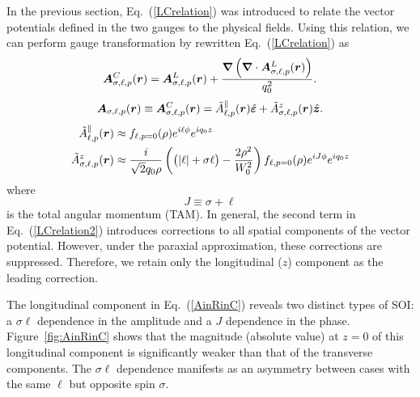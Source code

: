 In the previous section, Eq.~(\ref{LCrelation}) was introduced to relate the vector potentials defined in the two gauges to the physical fields. Using this relation, we can perform gauge transformation by rewritten Eq.~(\ref{LCrelation}) as
\begin{equation}
\color{G}
\boldsymbol{A}^{C}_{\sigma, \ell, p}(\boldsymbol{r})
=
\boldsymbol{A}^{L}_{\sigma, \ell, p}(\boldsymbol{r})
+
\frac{\boldsymbol{\nabla}
\left(
\boldsymbol{\nabla}\cdot
\boldsymbol{A}^{L}_{\sigma, \ell, p}(\boldsymbol{r})
\right)}
{q_0^2}.
\label{LCrelation2}
\end{equation}
\begin{equation}
\color{G}
\boldsymbol{A}_{\sigma, \ell, p}(\boldsymbol{r})
\equiv 
\boldsymbol{A}^{C}_{\sigma, \ell, p}(\boldsymbol{r})
=\tilde{A}^{\parallel}_{\ell, p}(\boldsymbol{r}) \hat{\boldsymbol{\varepsilon}} + \tilde{A}^{z}_{\sigma, \ell, p}(\boldsymbol{r}) \hat{\boldsymbol{z}}.
\end{equation}
\begin{equation} 
\color{G}
\begin{aligned}
\tilde{A}^{\parallel}_{\ell, p}(\boldsymbol{r})
&\approx 
f_{\ell,p=0}(\rho)e^{i\ell \phi}e^{i q_0 z}\\
\tilde{A}^{z}_{\sigma, \ell, p}(\boldsymbol{r})
&\approx
\frac{i}{\sqrt{2}q_0\rho}
\left(
\bigl(|\ell|+\sigma \ell\bigr)-\frac{2\rho^2}{W_0^2}
\right)
f_{\ell,p=0}(\rho)
e^{i J\phi}e^{i q_0 z}
\end{aligned}
\label{AinRinC} %
\end{equation}
where
\[
J\equiv \sigma+\ell
\]
is the total angular momentum (TAM). In general, the second term in Eq.~(\ref{LCrelation2}) introduces corrections to all spatial components of the vector potential. However, under the paraxial approximation, these corrections are suppressed. Therefore, we retain only the longitudinal ($z$) component as the leading correction.

The longitudinal component in Eq.~(\ref{AinRinC}) reveals two distinct types of SOI: a $\sigma\ell$ dependence in the amplitude and a $J$ dependence in the phase. Figure~\ref{fig:AinRinC} shows that the magnitude (absolute value) at $z=0$ of this longitudinal component is significantly weaker than that of the transverse components. The $\sigma\ell$ dependence manifests as an asymmetry between cases with the same $\ell$ but opposite spin $\sigma$.

